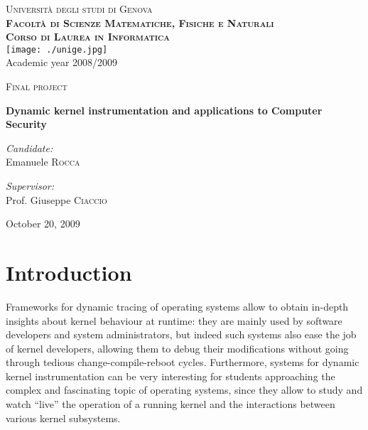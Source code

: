 \documentclass[11pt]{article}
\begin{document}
\begin{titlepage}
\begin{center}

\textsc{\LARGE Università degli studi di Genova}\\[1.5cm]

\textsc{\large \bfseries Facoltà di Scienze Matematiche, Fisiche e Naturali}\\[0.3cm]
\textsc{\large \bfseries Corso di Laurea in Informatica}\\[0.5cm]

\texttt{[image: ./unige.jpg]}\\[1cm]

Academic year 2008/2009

\textsc{\large Final project }\\[0.2cm]

\vspace{0.5cm}

{ 
\huge \bfseries Dynamic kernel instrumentation and applications to Computer Security
}\\[0.4cm]
 
\vspace{2cm}

\begin{minipage}{0.4\textwidth}
\begin{flushleft} \large
\emph{Candidate:}\\
Emanuele \textsc{Rocca}
\end{flushleft}
\end{minipage}
\begin{minipage}{0.4\textwidth}
\begin{flushright} \large
\emph{Supervisor:} \\
Prof. Giuseppe \textsc{Ciaccio}
\end{flushright}
\end{minipage}

\vspace{2.0cm}
 
{\large October 20, 2009}
 
\end{center}

\end{titlepage}

\tableofcontents
\pagebreak

\section{Introduction}
Frameworks for dynamic tracing of operating systems allow to obtain in-depth
insights about kernel behaviour at runtime: they are mainly used by software
developers and system administrators, but indeed such systems also ease the job
of kernel developers, allowing them to debug their modifications without going
through tedious change-compile-reboot cycles. Furthermore, systems for dynamic
kernel instrumentation can be very interesting for students approaching the
complex and fascinating topic of operating systems, since they allow to study
and watch ``live'' the operation of a running kernel and the interactions
between various kernel subsystems.
\end{document}

